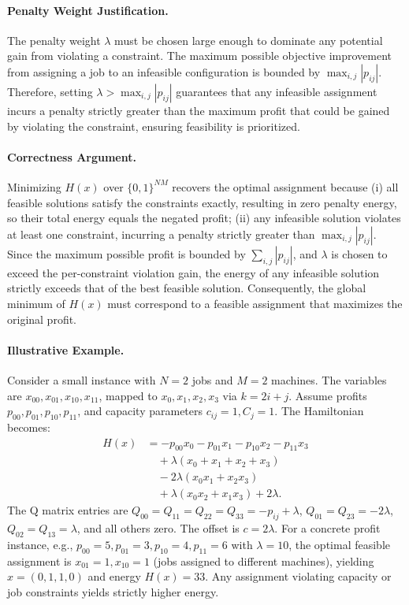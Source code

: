 \documentclass[12pt]{article}
\begin{document}
\paragraph{Penalty Weight Justification.}
The penalty weight $\lambda$ must be chosen large enough to dominate any potential gain from violating a constraint. The maximum possible objective improvement from assigning a job to an infeasible configuration is bounded by $\max_{i,j} |p_{ij}|$. Therefore, setting $\lambda > \max_{i,j} |p_{ij}|$ guarantees that any infeasible assignment incurs a penalty strictly greater than the maximum profit that could be gained by violating the constraint, ensuring feasibility is prioritized.

\paragraph{Correctness Argument.}
Minimizing $H(x)$ over $\{0,1\}^{NM}$ recovers the optimal assignment because (i) all feasible solutions satisfy the constraints exactly, resulting in zero penalty energy, so their total energy equals the negated profit; (ii) any infeasible solution violates at least one constraint, incurring a penalty strictly greater than $\max_{i,j} |p_{ij}|$. Since the maximum possible profit is bounded by $\sum_{i,j} |p_{ij}|$, and $\lambda$ is chosen to exceed the per-constraint violation gain, the energy of any infeasible solution strictly exceeds that of the best feasible solution. Consequently, the global minimum of $H(x)$ must correspond to a feasible assignment that maximizes the original profit.

\paragraph{Illustrative Example.}
Consider a small instance with $N=2$ jobs and $M=2$ machines. The variables are $x_{00}, x_{01}, x_{10}, x_{11}$, mapped to $x_0, x_1, x_2, x_3$ via $k = 2i + j$. Assume profits $p_{00}, p_{01}, p_{10}, p_{11}$, and capacity parameters $c_{ij}=1, C_j=1$. The Hamiltonian becomes:
\begin{align}
    H(x) &= -p_{00}x_0 - p_{01}x_1 - p_{10}x_2 - p_{11}x_3 \nonumber \\
    &\quad + \lambda(x_0 + x_1 + x_2 + x_3) \nonumber \\
    &\quad - 2\lambda(x_0 x_1 + x_2 x_3) \nonumber \\
    &\quad + \lambda(x_0 x_2 + x_1 x_3) + 2\lambda.
\end{align}
The Q matrix entries are $Q_{00}=Q_{11}=Q_{22}=Q_{33} = -p_{ij}+\lambda$, $Q_{01}=Q_{23}=-2\lambda$, $Q_{02}=Q_{13}=\lambda$, and all others zero. The offset is $c=2\lambda$. For a concrete profit instance, e.g., $p_{00}=5, p_{01}=3, p_{10}=4, p_{11}=6$ with $\lambda=10$, the optimal feasible assignment is $x_{01}=1, x_{10}=1$ (jobs assigned to different machines), yielding $x=(0,1,1,0)$ and energy $H(x) = 33$. Any assignment violating capacity or job constraints yields strictly higher energy.
\end{document}
